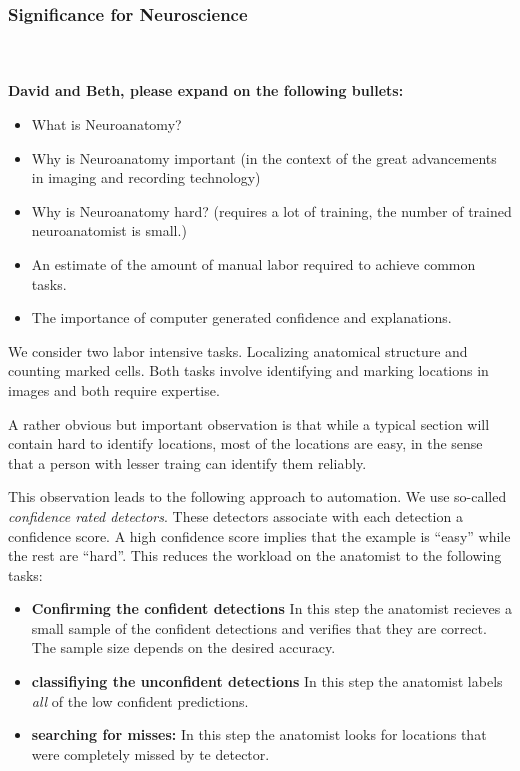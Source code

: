 \documentclass[runningheads]{llncs}
\begin{document}
\subsubsection {Significance for Neuroscience}
~\\ ~\\
{\bf David and Beth, please expand on the following bullets:}
\begin{itemize}
\item What is Neuroanatomy?
\item Why is Neuroanatomy important (in the context of the great
    advancements in imaging and recording technology)
\item Why is Neuroanatomy hard? (requires a lot of training, the
  number of trained neuroanatomist is small.)
\item An estimate of the amount of manual labor required to achieve
  common tasks.
\item The importance of computer generated confidence and explanations.
\end{itemize}


We consider two labor intensive tasks. Localizing anatomical structure
and counting marked cells. Both tasks involve identifying and marking
locations in images and both require expertise.

A rather obvious but important observation is that while a typical
section will contain hard to identify locations, most of the locations
are easy, in the sense that a person with lesser traing can identify
them reliably.

This observation leads to the following approach to automation. We
use so-called {\em confidence rated detectors}. These detectors
associate with each detection a confidence score. A high confidence
score implies that the example is ``easy''  while the rest are
``hard''. This reduces the workload on the anatomist to the following
tasks:
\begin{itemize}
  \item {\bf Confirming the confident detections} In this step the
    anatomist recieves a small sample of the confident detections and
    verifies that they are correct. The sample size depends on the
    desired accuracy.
    \item {\bf classifiying the unconfident detections} In this step
      the anatomist labels {\em all} of the low confident predictions.
    \item {\bf searching for misses:} In this step the anatomist looks
      for locations that were completely missed by te detector.
  \end{itemize}
  
\end{document}
